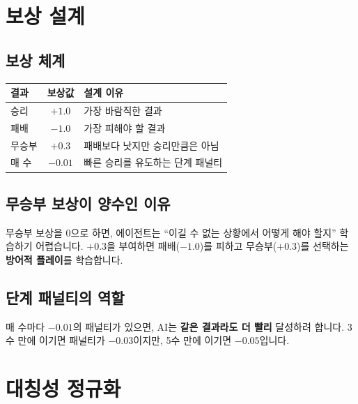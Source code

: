 \documentclass[11pt,a4paper]{article}
\begin{document}
\section{보상 설계}

\subsection{보상 체계}

\begin{center}
\renewcommand{\arraystretch}{1.4}
\begin{tabular}{|l|c|p{7cm}|}
\hline
\rowcolor{tableheader}
\textbf{결과} & \textbf{보상값} & \textbf{설계 이유} \\
\hline
승리 & $+1.0$ & 가장 바람직한 결과 \\
\hline
패배 & $-1.0$ & 가장 피해야 할 결과 \\
\hline
무승부 & $+0.3$ & 패배보다 낫지만 승리만큼은 아님 \\
\hline
매 수 & $-0.01$ & 빠른 승리를 유도하는 단계 패널티 \\
\hline
\end{tabular}
\end{center}

\subsection{무승부 보상이 양수인 이유}

무승부 보상을 0으로 하면, 에이전트는 ``이길 수 없는 상황에서 어떻게 해야 할지'' 학습하기 어렵습니다. $+0.3$을 부여하면 패배($-1.0$)를 피하고 무승부($+0.3$)를 선택하는 \textbf{방어적 플레이}를 학습합니다.

\subsection{단계 패널티의 역할}

매 수마다 $-0.01$의 패널티가 있으면, AI는 \textbf{같은 결과라도 더 빨리} 달성하려 합니다. 3수 만에 이기면 패널티가 $-0.03$이지만, 5수 만에 이기면 $-0.05$입니다.

\section{대칭성 정규화}
\end{document}
